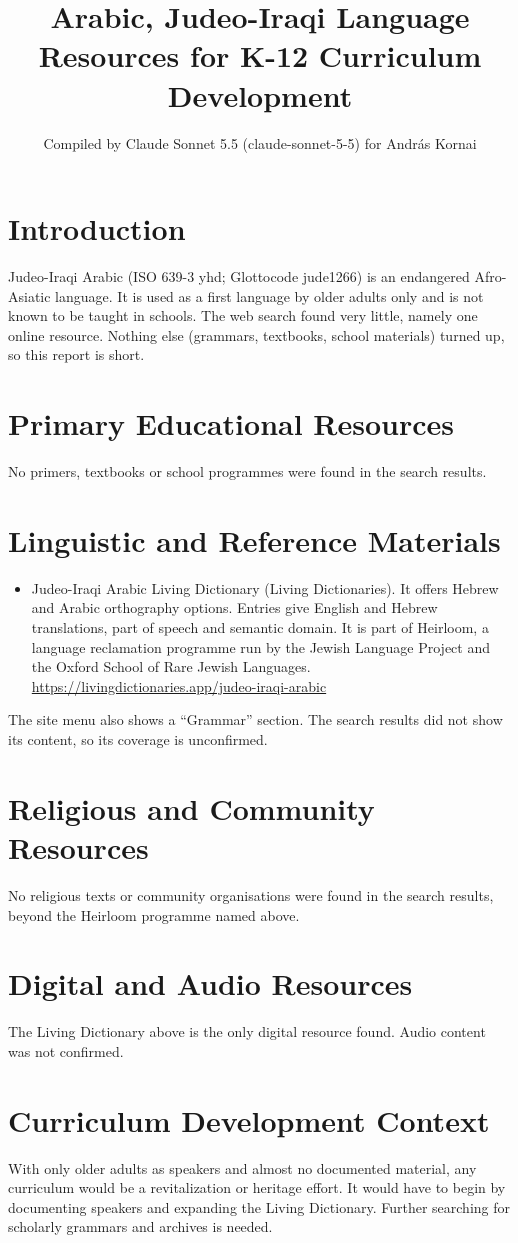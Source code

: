 \documentclass[12pt]{article}
\title{Arabic, Judeo-Iraqi Language Resources for K-12 Curriculum Development}
\author{Compiled by Claude Sonnet 5.5 (claude-sonnet-5-5) for Andr\'as Kornai}
\date{}
\begin{document}
\maketitle

\section{Introduction}
Judeo-Iraqi Arabic (ISO 639-3 yhd; Glottocode jude1266) is an endangered Afro-Asiatic language. It is used as a first language by older adults only and is not known to be taught in schools. The web search found very little, namely one online resource. Nothing else (grammars, textbooks, school materials) turned up, so this report is short.

\section{Primary Educational Resources}
No primers, textbooks or school programmes were found in the search results.

\section{Linguistic and Reference Materials}
\begin{itemize}
\item Judeo-Iraqi Arabic Living Dictionary (Living Dictionaries). It offers Hebrew and Arabic orthography options. Entries give English and Hebrew translations, part of speech and semantic domain. It is part of Heirloom, a language reclamation programme run by the Jewish Language Project and the Oxford School of Rare Jewish Languages. \url{https://livingdictionaries.app/judeo-iraqi-arabic}
\end{itemize}
The site menu also shows a ``Grammar'' section. The search results did not show its content, so its coverage is unconfirmed.

\section{Religious and Community Resources}
No religious texts or community organisations were found in the search results, beyond the Heirloom programme named above.

\section{Digital and Audio Resources}
The Living Dictionary above is the only digital resource found. Audio content was not confirmed.

\section{Curriculum Development Context}
With only older adults as speakers and almost no documented material, any curriculum would be a revitalization or heritage effort. It would have to begin by documenting speakers and expanding the Living Dictionary. Further searching for scholarly grammars and archives is needed.
\end{document}

